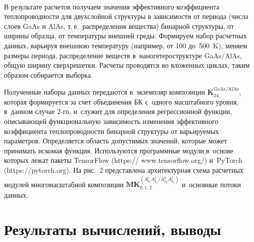 \begin{multicols}{2}
     \begin{figure*} %
     \vspace*{1pt}
    \begin{center}  
  \mbox{%
 \epsfxsize=154.934mm 
 }
\end{center}
\vspace*{-3pt}
\vspace*{11pt}
     \end{figure*}
    
     В результате расчетов получаем значения эффективного коэффициента 
теплопроводности для двухслойной структуры в зависимости от периода (числа 
слоев GaAs и AlAs, т.\,е.\ распределения вещества) бинарной структуры, от 
ширины образца, от температуры внешней среды. Формируем набор расчетных 
данных, варьируя внешнюю температуру (например, от 100 до~500~K), меняем 
размеры периода, распределение веществ в~наногетероструктуре GaAs/AlAs, 
общую ширину сверхрешетки. Расчеты проводятся во вложенных циклах, таким 
образом собирается выборка. 
    
    Полученные наборы данных передаются в~экземпляр композиции 
$\boldsymbol{K}_{24}^{\mathrm{GaAs/AlAs}}$, которая формируется за счет 
объединения БК с~одного масштабного уровня, в~данном случае \mbox{2-го}, 
и~служит для определения регрессионной функции, описывающей 
функциональную за\-ви\-си\-мость изменения эффективного коэффициента 
теплопроводности бинарной структуры от варь\-и\-ру\-емых па\-ра\-мет\-ров. 
Определяется об\-ласть до\-пус\-ти\-мых значений, которые может принимать 
искомая функция. Используются программные модули,\linebreak в~основе которых лежат 
пакеты \mbox{TensorFlow} ({\sf https:// www.tensorflow.org/}) и~\mbox{PyTorch} 
(https://pytorch.org). На рис.~2 пред\-став\-ле\-на архитектурная схема расчетных 
модулей многомасштабной композиции 
$\mathbf{MK}_{0,1,2}^{(A^i_{a_i}A^j_{a_j}/A^k_{a_k}A^j_{a_j})}$ 
и~основные потоки данных.
     

     
\section{Результаты вычислений, выводы}

\vspace*{-15pt}


\end{multicols}
